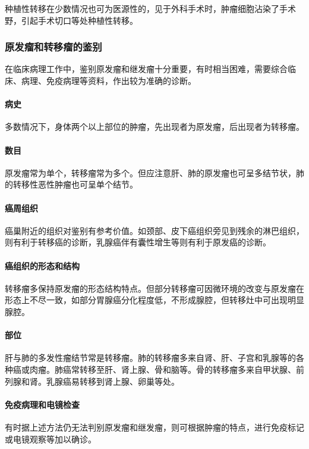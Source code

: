 种植性转移在少数情况也可为医源性的，见于外科手术时，肿瘤细胞沾染了手术野，引起手术切口等处种植性转移。

\subsubsection{原发瘤和转移瘤的鉴别}

在临床病理工作中，鉴别原发瘤和继发瘤十分重要，有时相当困难，需要综合临床、病理、免疫病理等资料，作出较为准确的诊断。

\paragraph{病史}
多数情况下，身体两个以上部位的肿瘤，先出现者为原发瘤，后出现者为转移瘤。

\paragraph{数目}
原发瘤常为单个，转移瘤常为多个。但应注意肝、肺的原发瘤也可呈多结节状，肺的转移性恶性肿瘤也可呈单个结节。

\paragraph{癌周组织}
癌巢附近的组织对鉴别有参考价值。如颈部、皮下癌组织旁见到残余的淋巴组织，则有利于转移癌的诊断，乳腺癌伴有囊性增生等则有利于原发癌的诊断。

\paragraph{癌组织的形态和结构}
转移瘤多保持原发瘤的形态结构特点。但部分转移瘤可因微环境的改变与原发瘤在形态上不尽一致，如部分胃腺癌分化程度低，不形成腺腔，但转移灶中可出现明显腺腔。

\paragraph{部位}
肝与肺的多发性瘤结节常是转移瘤。肺的转移瘤多来自肾、肝、子宫和乳腺等的各种癌或肉瘤。肺癌常转移至肝、肾上腺、骨和脑等。骨的转移瘤多来自甲状腺、前列腺和肾。乳腺癌易转移到肾上腺、卵巢等处。

\paragraph{免疫病理和电镜检查}
有时据上述方法仍无法判别原发瘤和继发瘤，则可根据肿瘤的特点，进行免疫标记或电镜观察等加以确诊。

